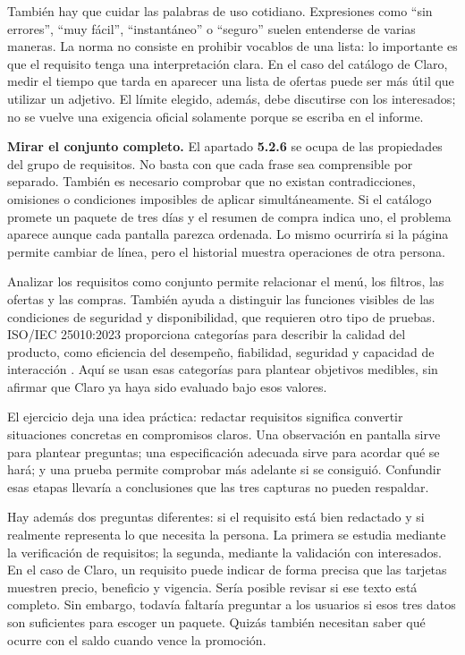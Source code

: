 \documentclass[12pt,a4paper]{article}
\begin{document}
También hay que cuidar las palabras de uso cotidiano. Expresiones como ``sin errores'', ``muy fácil'', ``instantáneo'' o ``seguro'' suelen entenderse de varias maneras. La norma no consiste en prohibir vocablos de una lista: lo importante es que el requisito tenga una interpretación clara. En el caso del catálogo de Claro, medir el tiempo que tarda en aparecer una lista de ofertas puede ser más útil que utilizar un adjetivo. El límite elegido, además, debe discutirse con los interesados; no se vuelve una exigencia oficial solamente porque se escriba en el informe.

\textbf{Mirar el conjunto completo.} El apartado \textbf{5.2.6} se ocupa de las propiedades del grupo de requisitos. No basta con que cada frase sea comprensible por separado. También es necesario comprobar que no existan contradicciones, omisiones o condiciones imposibles de aplicar simultáneamente. Si el catálogo promete un paquete de tres días y el resumen de compra indica uno, el problema aparece aunque cada pantalla parezca ordenada. Lo mismo ocurriría si la página permite cambiar de línea, pero el historial muestra operaciones de otra persona.

Analizar los requisitos como conjunto permite relacionar el menú, los filtros, las ofertas y las compras. También ayuda a distinguir las funciones visibles de las condiciones de seguridad y disponibilidad, que requieren otro tipo de pruebas. ISO/IEC 25010:2023 proporciona categorías para describir la calidad del producto, como eficiencia del desempeño, fiabilidad, seguridad y capacidad de interacción \cite{iso25010}. Aquí se usan esas categorías para plantear objetivos medibles, sin afirmar que Claro ya haya sido evaluado bajo esos valores.

El ejercicio deja una idea práctica: redactar requisitos significa convertir situaciones concretas en compromisos claros. Una observación en pantalla sirve para plantear preguntas; una especificación adecuada sirve para acordar qué se hará; y una prueba permite comprobar más adelante si se consiguió. Confundir esas etapas llevaría a conclusiones que las tres capturas no pueden respaldar.

Hay además dos preguntas diferentes: si el requisito está bien redactado y si realmente representa lo que necesita la persona. La primera se estudia mediante la verificación de requisitos; la segunda, mediante la validación con interesados. En el caso de Claro, un requisito puede indicar de forma precisa que las tarjetas muestren precio, beneficio y vigencia. Sería posible revisar si ese texto está completo. Sin embargo, todavía faltaría preguntar a los usuarios si esos tres datos son suficientes para escoger un paquete. Quizás también necesitan saber qué ocurre con el saldo cuando vence la promoción.
\end{document}
